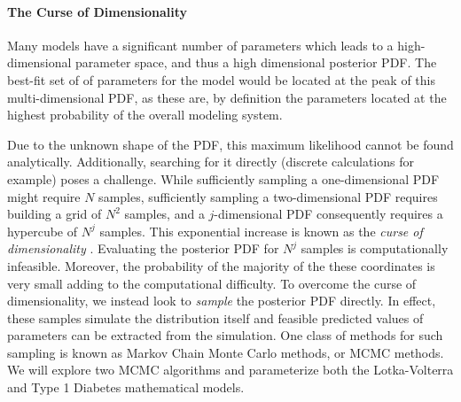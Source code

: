 \paragraph{The Curse of Dimensionality}
Many models have a significant number of parameters which leads to a high-dimensional parameter space, and thus a high dimensional posterior PDF. The best-fit set of of parameters for the model would be located at the peak of this multi-dimensional PDF, as these are, by definition the parameters located at the highest probability of the overall modeling system. 
\par Due to the unknown shape of the PDF, this maximum likelihood cannot be found analytically. Additionally, searching for it directly (discrete calculations for example) poses a challenge. While sufficiently sampling a one-dimensional PDF might require $N$ samples, sufficiently sampling a two-dimensional PDF requires building a grid of $N^{2}$ samples, and a $j$-dimensional PDF consequently requires a hypercube of $N^{j}$ samples. This exponential increase is known as the \emph{curse of dimensionality} \cite{astrostats}. Evaluating the posterior PDF for $N^{j}$ samples is computationally infeasible. Moreover, the probability of the majority of the these coordinates is very small adding to the computational difficulty. To overcome the curse of dimensionality, we instead look to \emph{sample} the posterior PDF directly. In effect, these samples simulate the distribution itself and feasible predicted values of parameters can be extracted from the simulation. One class of methods for such sampling is known as Markov Chain Monte Carlo methods, or MCMC methods. We will explore two MCMC algorithms and parameterize both the Lotka-Volterra and Type 1 Diabetes mathematical models. 

